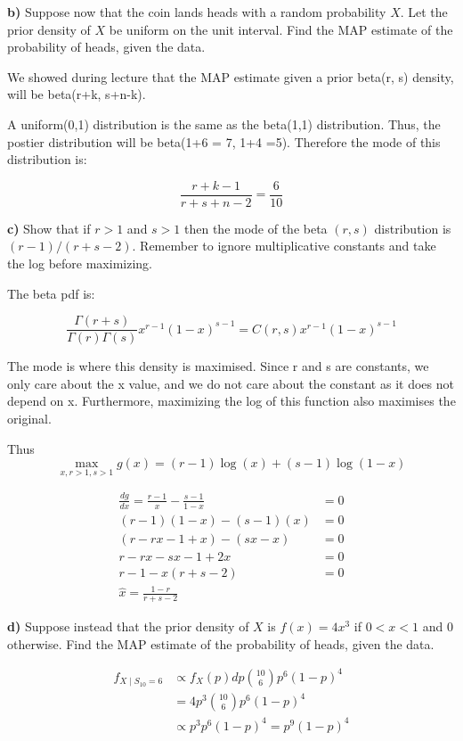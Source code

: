 \documentclass[11pt]{article}
\begin{document}
\textbf{b)} Suppose now that the coin lands heads with a random
probability \(X\). Let the prior density of \(X\) be uniform on the unit
interval. Find the MAP estimate of the probability of heads, given the
data.


We showed during lecture that the MAP estimate given a prior beta(r, s) density, will be beta(r+k, s+n-k).

A uniform(0,1) distribution is the same as the beta(1,1) distribution. Thus, the postier distribution will be beta(1+6 = 7, 1+4 =5). Therefore the mode of this distribution is:

$$\frac{r+k-1}{r+s+n-2} = \frac{6}{10}$$

\textbf{c)} Show that if \(r > 1\) and \(s > 1\) then the mode of the
beta \((r, s)\) distribution is \((r-1)/(r+s-2)\). Remember to ignore
multiplicative constants and take the log before maximizing.


The beta pdf is:

$$\frac{\Gamma(r+s)}{\Gamma(r)\Gamma(s)}x^{r-1}(1-x)^{s-1} = C(r,s)x^{r-1}(1-x)^{s-1}$$

The mode is where this density is maximised. Since r and s are constants, we only care about the x value, and we do not care about the constant as it does not depend on x. 
Furthermore, maximizing the log of this function also maximises the original. 

Thus
$$
	\max_{x, r>1, s>1} g(x)  = (r-1)\log(x) + (s-1)\log(1-x) 
$$

\begin{align*}
	\frac{dg}{dx} = \frac{r-1}{x} - \frac{s-1}{1-x} &= 0 \\
	(r-1)(1-x) - (s-1)(x) &= 0 \\
	(r - rx -1 +x) - (sx - x) &= 0 \\
	r - rx - sx - 1 +2x &= 0 \\
	r - 1 -x(r + s - 2) &= 0 \\
	\boxed{\hat x = \frac{1-r}{r+s-2}}
\end{align*}

\textbf{d)} Suppose instead that the prior density of \(X\) is
\(f(x) = 4x^3\) if \(0 < x < 1\) and \(0\) otherwise. Find the MAP
estimate of the probability of heads, given the data.


\begin{align*}
	f_{X \mid S_{10}=  6} &\propto f_{X}(p)dp \binom{10}{6}p^{6}(1-p)^{4} \\
	&= 4p^{3} \binom{10}{6} p^{6}(1-p)^{4} \\
	&\propto p^{3} p^{6}(1-p)^{4} = p^{9}(1-p)^{4}
\end{align*}
\end{document}
